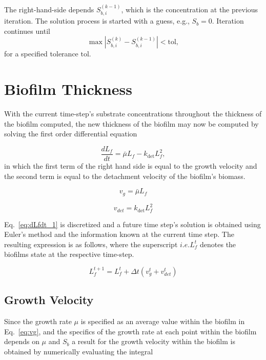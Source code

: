 \documentclass[letterpaper, twoside]{article}
\numberwithin{equation}{section}
\newcommand{\ie}{i.e.}
\begin{document}
The right-hand-side depends $S_{b,i}^{(k-1)}$, which is the concentration at the previous iteration.  The solution process is started with a guess, e.g., $S_b=0$. Iteration continues until
\begin{equation*}
  \max\left| S_{b,i}^{(k)} - S_{b,i}^{(k-1)} \right| < \mathrm{tol},
\end{equation*}
for a specified tolerance $\mathrm{tol}$.

\section{Biofilm Thickness}
With the current time-step's substrate concentrations throughout the thickness of the biofilm computed, the new thickness of the biofilm may now be computed by solving the first order differential equation

\begin{equation}
  \label{eq:dLfdt_1}
  \frac{d L_f}{dt} = {\bar\mu L_f}-{k_{\mathrm{det}}L_f^2},
\end{equation}
in which the first term of the right hand side is equal to the growth velocity and the second term is equal to the detachment velocity of the biofilm's biomass. 

\begin{equation}
  \label{eq:vg}
  v_g={\bar\mu L_f}
\end{equation}

\begin{equation}
  \label{eq:vdet}
  v_{det}={k_{\mathrm{det}}L_f^2}
\end{equation}

Eq.~\ref{eq:dLfdt_1} is discretized and a future time step's solution is obtained using Euler's method and the information known at the current time step. The resulting expression is as follows, where the superscript $\ie L_f^{t}$ denotes the biofilms state at the respective time-step.

\begin{equation}
  \label{eq:dLfdt_2}
  {L_f^{t+1}}={L_f^{t}} + {\Delta t}({v_g^{t}+v_{det}^{t}})
\end{equation}

\subsection{Growth Velocity}
Since the growth rate $\mu$ is specified as an average value within the biofilm in Eq.~\ref{eq:vg}, and the specifics of the growth rate at each point within the biofilm depends on $\mu$ and $S_b$ a result for the growth velocity within the biofilm is obtained by numerically evaluating the integral 
\end{document}
